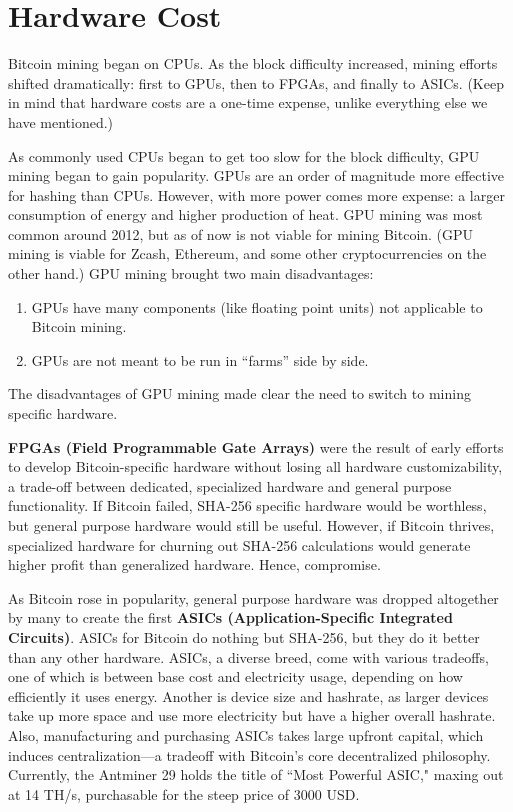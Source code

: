\documentclass[full.tex]{subfiles}
\begin{document}
    \section*{Hardware Cost}
    
    Bitcoin mining began on CPUs. As the block difficulty increased, mining efforts shifted dramatically: first to GPUs, then to FPGAs, and finally to ASICs. (Keep in mind that hardware costs are a one-time expense, unlike everything else we have mentioned.)
    
    As commonly used CPUs began to get too slow for the block difficulty, GPU mining began to gain popularity. GPUs are an order of magnitude more effective for hashing than CPUs. However, with more power comes more expense: a larger consumption of energy and higher production of heat. GPU mining was most common around 2012, but as of now is not viable for mining Bitcoin. (GPU mining is viable for Zcash, Ethereum, and some other cryptocurrencies on the other hand.) GPU mining brought two main disadvantages:
    
    \begin{enumerate}
        \item GPUs have many components (like floating point units) not applicable to Bitcoin mining.
        \item GPUs are not meant to be run in ``farms'' side by side.
    \end{enumerate}
    
    The disadvantages of GPU mining made clear the need to switch to mining specific hardware.
    
    \textbf{FPGAs (Field Programmable Gate Arrays)} were the result of early efforts to develop Bitcoin-specific hardware without losing all hardware customizability, a trade-off between dedicated, specialized hardware and general purpose functionality. If Bitcoin failed, SHA-256 specific hardware would be worthless, but general purpose hardware would still be useful. However, if Bitcoin thrives, specialized hardware for churning out SHA-256 calculations would generate higher profit than generalized hardware. Hence, compromise.
    
    As Bitcoin rose in popularity, general purpose hardware was dropped altogether by many to create the first \textbf{ASICs (Application-Specific Integrated Circuits)}. ASICs for Bitcoin do nothing but SHA-256, but they do it better than any other hardware. ASICs, a diverse breed, come with various tradeoffs,  one of which is between base cost and electricity usage, depending on how efficiently it uses energy. Another is device size and hashrate, as larger devices take up more space and use more electricity but have a higher overall hashrate. Also, manufacturing and purchasing ASICs takes large upfront capital, which induces centralization---a tradeoff with Bitcoin's core decentralized philosophy. Currently, the Antminer 29 holds the title of ``Most Powerful ASIC," maxing out at 14 TH/s, purchasable for the steep price of 3000 USD.
    
\end{document}
